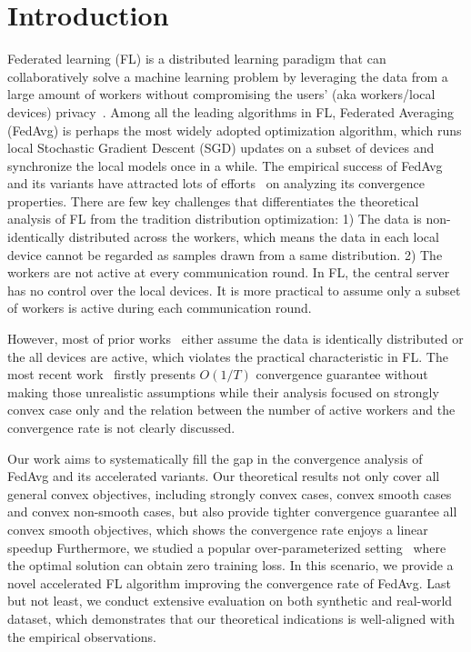 

\section{Introduction}
Federated learning (FL) is a distributed learning paradigm that can collaboratively solve a machine learning problem by leveraging the data
from a large amount of workers without compromising the users' (aka workers/local devices) privacy~\cite{kairouz2019advances}. 
Among all the leading algorithms in FL, Federated Averaging~\cite{mcmahan2016communication} (FedAvg)
is perhaps the most widely adopted optimization algorithm, which runs local
Stochastic Gradient Descent (SGD) updates on a subset of devices
and synchronize the local models once in a while. 
The empirical success of FedAvg and its variants have
attracted lots of efforts~\cite{li2018federated,stich2018local,khaled2019first,yu2019parallel,haddadpour2019convergence,li2019convergence,huo2020faster} on analyzing its convergence properties. 
There are few key challenges that differentiates the theoretical analysis
of FL from the tradition distribution optimization: 
1) The data is non-identically distributed across the workers, which means the
data in each local device cannot be regarded as samples drawn from
a same distribution. 
2) The workers are not active at every communication
round. In FL, the central server has no control over the local devices. 
It is more practical to assume only a subset of workers is active during
each communication round. 

However, most of prior works~\cite{li2018federated,stich2018local,khaled2019first,yu2019parallel,haddadpour2019convergence} either assume
the data is identically distributed or the all devices are active, which
violates the practical characteristic in FL. The most recent work~\cite{li2019convergence} firstly presents $O(1/T)$ convergence guarantee without 
making those unrealistic assumptions while their analysis focused 
on strongly convex case only and the relation between the number of active
workers and the convergence rate is not clearly discussed. 

Our work aims to systematically fill the gap in the convergence analysis
of FedAvg and its accelerated variants. 
Our theoretical results not only cover all general convex objectives, including strongly convex cases, convex smooth cases and convex non-smooth cases, but also provide tighter convergence guarantee all convex smooth objectives, which shows the convergence rate enjoys a linear speedup 
Furthermore, we studied a popular over-parameterized setting~\cite{liu2018accelerating} where the optimal solution can obtain zero training loss. In this scenario, we provide a novel accelerated FL algorithm improving
the convergence rate of FedAvg. Last but not least, we conduct extensive
evaluation on both synthetic and real-world dataset, which demonstrates that our theoretical indications is well-aligned with the empirical observations.


